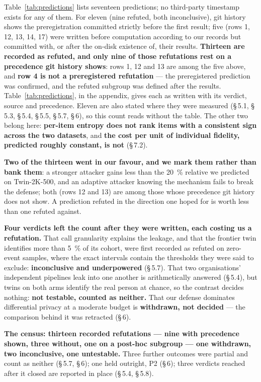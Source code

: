 \documentclass[sigconf,anonymous,review]{acmart}
\begin{document}
Table~\ref{tab:predictions} lists seventeen predictions; no third-party timestamp exists for any of them. For eleven (nine refuted, both inconclusive), git history shows the preregistration committed strictly before the first result; five (rows 1, 12, 13, 14, 17) were written before computation according to our records but committed with, or after the on-disk existence of, their results. \textbf{Thirteen are recorded as refuted, and only nine of those refutations rest on a precedence git history shows}: rows 1, 12 and 13 are among the five above, and \textbf{row 4 is not a preregistered refutation} --- the preregistered prediction was confirmed, and the refuted subgroup was defined after the results. Table~\ref{tab:predictions}, in the appendix, gives each as written with its verdict, source and precedence. Eleven are also stated where they were measured (\S\,5.1, \S\,5.3, \S\,5.4, \S\,5.5, \S\,5.7, \S\,6), so this count reads without the table. The other two belong here: \textbf{per-item entropy does not rank items with a consistent sign across the two datasets}, and \textbf{the cost per unit of individual fidelity, predicted roughly constant, is not} (\S\,7.2).

\textbf{Two of the thirteen went in our favour, and we mark them rather than bank them}: a stronger attacker gains less than the 20~\% relative we predicted on Twin-2K-500, and an adaptive attacker knowing the mechanism fails to break the defense; both (rows 12 and 13) are among those whose precedence git history does not show. A prediction refuted in the direction one hoped for is worth less than one refuted against.

\textbf{Four verdicts left the count after they were written, each costing us a refutation.} That call granularity explains the leakage, and that the frontier twin identifies more than 5~\% of its cohort, were first recorded as refuted on zero-event samples, where the exact intervals contain the thresholds they were said to exclude: \textbf{inconclusive and underpowered} (\S\,5.7). That two organisations' independent pipelines leak into one another is arithmetically answered (\S\,5.4), but twins on both arms identify the real person at chance, so the contrast decides nothing: \textbf{not testable, counted as neither.} That our defense dominates differential privacy at a moderate budget is \textbf{withdrawn, not decided} --- the comparison behind it was retracted (\S\,6).

\textbf{The census: thirteen recorded refutations --- nine with precedence shown, three without, one on a post-hoc subgroup --- one withdrawn, two inconclusive, one untestable.} Three further outcomes were partial and count as neither (\S\,5.7, \S\,6); one held outright, P2 (\S\,6); three verdicts reached after it closed are reported in place (\S\,5.4, \S\,5.8).
\end{document}

